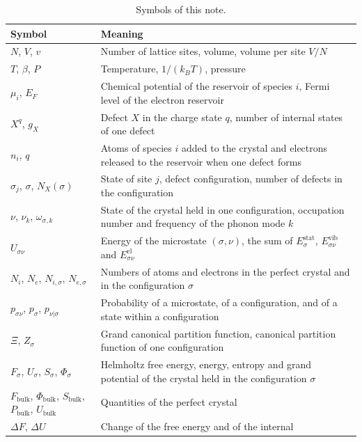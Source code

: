 \documentclass[11pt]{article}      %
\numberwithin{equation}{section}   %
\begin{document}
\begin{table}[H]
\centering
\caption{Symbols of this note.}
\label{tab:symbols}
\renewcommand{\arraystretch}{1.15}
\begin{tabular}{|>{\raggedright\arraybackslash}p{}
                |>{\raggedright\arraybackslash}p{}|}
\hline
Symbol & Meaning \\ \hline
$N$, $V$, $v$ & Number of lattice sites, volume, volume per site $V/N$ \\ \hline
$T$, $\beta$, $P$ & Temperature, $1/(k_BT)$, pressure \\ \hline
$\mu_i$, $E_F$ & Chemical potential of the reservoir of species $i$, Fermi
level of the electron reservoir \\ \hline
$X^q$, $g_X$ & Defect $X$ in the charge state $q$, number of internal
states of one defect \\ \hline
$n_i$, $q$ & Atoms of species $i$ added to the crystal and electrons
released to the reservoir when one defect forms \\ \hline
$\sigma_j$, $\sigma$, $N_X(\sigma)$ & State of site $j$, defect
configuration, number of defects in the configuration \\ \hline
$\nu$, $\nu_k$, $\omega_{\sigma,k}$ & State of the crystal held in one
configuration, occupation number and frequency of the phonon mode $k$ \\ \hline
$U_{\sigma\nu}$ & Energy of the microstate $(\sigma,\nu)$, the sum of
$E^{\text{stat}}_\sigma$, $E^{\text{vib}}_{\sigma\nu}$ and
$E^{\text{el}}_{\sigma\nu}$ \\ \hline
$N_i$, $N_e$, $N_{i,\sigma}$, $N_{e,\sigma}$ & Numbers of atoms and
electrons in the perfect crystal and in the configuration $\sigma$ \\ \hline
$p_{\sigma\nu}$, $p_\sigma$, $p_{\nu|\sigma}$ & Probability of a
microstate, of a configuration, and of a state within a configuration \\ \hline
$\Xi$, $Z_\sigma$ & Grand canonical partition function, canonical partition
function of one configuration \\ \hline
$F_\sigma$, $U_\sigma$, $S_\sigma$, $\Phi_\sigma$ & Helmholtz free energy,
energy, entropy and grand potential of the crystal held in the
configuration $\sigma$ \\ \hline
$F_{\text{bulk}}$, $\Phi_{\text{bulk}}$, $S_{\text{bulk}}$,
$P_{\text{bulk}}$, $U_{\text{bulk}}$ & Quantities of the perfect crystal \\ \hline
$\Delta F$, $\Delta U$ & Change of the free energy and of the internal

\end{tabular}
\end{table}
\end{document}

